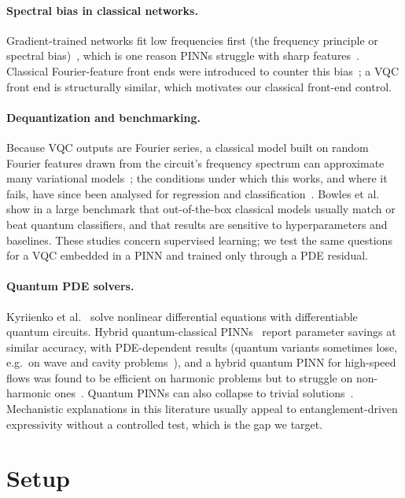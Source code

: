 \documentclass[11pt]{article}
\begin{document}
\paragraph{Spectral bias in classical networks.} Gradient-trained networks fit low
frequencies first (the frequency principle or spectral bias)~\cite{xu,rahaman}, which
is one reason PINNs struggle with sharp features~\cite{wang,krishnapriyan}. Classical
Fourier-feature front ends were introduced to counter this bias~\cite{tancik}; a VQC
front end is structurally similar, which motivates our classical front-end control.

\paragraph{Dequantization and benchmarking.} Because VQC outputs are Fourier series, a
classical model built on random Fourier features drawn from the circuit's frequency
spectrum can approximate many variational models~\cite{landman}; the conditions under
which this works, and where it fails, have since been analysed for regression and
classification~\cite{sweke,sahebi}. Bowles et al.~\cite{bowles} show in a large
benchmark that out-of-the-box classical models usually match or beat quantum
classifiers, and that results are sensitive to hyperparameters and baselines. These
studies concern supervised learning; we test the same questions for a VQC embedded in
a PINN and trained only through a PDE residual.

\paragraph{Quantum PDE solvers.} Kyriienko et al.~\cite{dqc} solve nonlinear
differential equations with differentiable quantum circuits. Hybrid quantum-classical
PINNs~\cite{qapinn,qcpinn} report parameter savings at similar accuracy, with
PDE-dependent results (quantum variants sometimes lose, e.g.\ on wave and cavity
problems~\cite{qcpinn}), and a hybrid quantum PINN for high-speed flows was found to be
efficient on harmonic problems but to struggle on non-harmonic ones~\cite{leong}.
Quantum PINNs can also collapse to trivial solutions~\cite{chen}. Mechanistic explanations in this literature usually appeal to
entanglement-driven expressivity without a controlled test, which is the gap we target.

\section{Setup}
\end{document}
